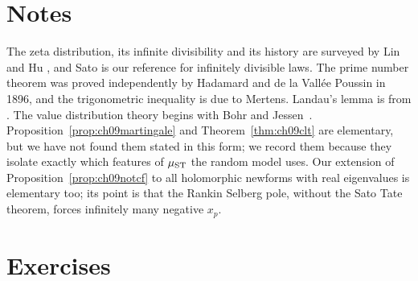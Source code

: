 \section{Notes}

The zeta distribution, its infinite divisibility and its history are surveyed by Lin and Hu \cite{linhu2001}, and Sato \cite{sato1999} is our reference for infinitely divisible laws. The prime number theorem was proved independently by Hadamard \cite{hadamard1896} and de la Vallée Poussin \cite{delavalleepoussin1896} in 1896, and the trigonometric inequality is due to Mertens. Landau's lemma is from \cite{landau1905}. The value distribution theory begins with Bohr and Jessen~\cite{bohrjessen1930}. Proposition~\ref{prop:ch09martingale} and Theorem~\ref{thm:ch09clt} are elementary, but we have not found them stated in this form; we record them because they isolate exactly which features of $\mu_{\mathrm{ST}}$ the random model uses. Our extension of Proposition~\ref{prop:ch09notcf} to all holomorphic newforms with real eigenvalues is elementary too; its point is that the Rankin Selberg pole, without the Sato Tate theorem, forces infinitely many negative $x_p$.

\section{Exercises}

